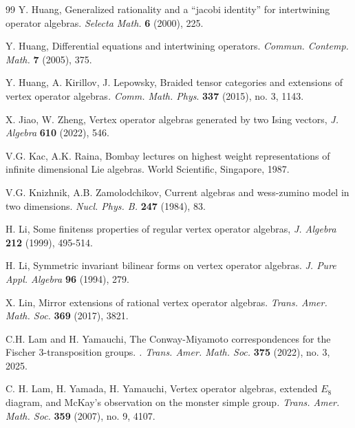 \documentclass{article}
\begin{document}
\begin{thebibliography}{99}
 Y. Huang, Generalized rationality and a ``jacobi
identity\textquotedblright{} for intertwining operator algebras. \emph{Selecta
Math.}\textbf{ 6 }(2000), 225.

 Y. Huang, Differential equations and intertwining operators. \emph{Commun.
	Contemp. Math.}\textbf{ 7 }(2005), 375.

 Y. Huang, A. Kirillov, J. Lepowsky, Braided tensor
categories and extensions of vertex operator algebras\emph{. Comm.
Math. Phys}. \textbf{337} (2015), no. 3, 1143.

 X. Jiao, W. Zheng, Vertex operator algebras generated by two Ising vectors,
\emph{J. Algebra} \textbf{610} (2022), 546.


 V.G. Kac, A.K. Raina, Bombay lectures on highest
weight representations of infinite dimensional Lie algebras. World
Scientific, Singapore, 1987.

 V.G. Knizhnik, A.B. Zamolodchikov, Current algebras
and wess-zumino model in two dimensions.\emph{ Nucl. Phys. B.} \textbf{247}
(1984), 83.

  H. Li, Some finitenss properties of regular vertex operator algebras, {\em J. Algebra} {\bf 212} (1999), 495-514.

H. Li, Symmetric invariant bilinear forms on vertex
operator algebras. \emph{J. Pure Appl. Algebra} \textbf{96 }(1994),
279.

X. Lin, Mirror extensions of rational vertex operator algebras.
\emph{Trans. Amer. Math. Soc.} \textbf{369} (2017), 3821.


 C.H. Lam and H. Yamauchi, 
The Conway-Miyamoto correspondences for the Fischer 3-transposition groups.
\emph{. Trans. Amer. Math. Soc. }\textbf{375} (2022), no. 3, 2025.

 C. H. Lam, H. Yamada, H. Yamauchi, Vertex operator
algebras, extended $E_{8}$ diagram, and McKay's observation on the
monster simple group\emph{. Trans. Amer. Math. Soc. }\textbf{359}
(2007), no. 9, 4107.


\end{thebibliography}
\end{document}
